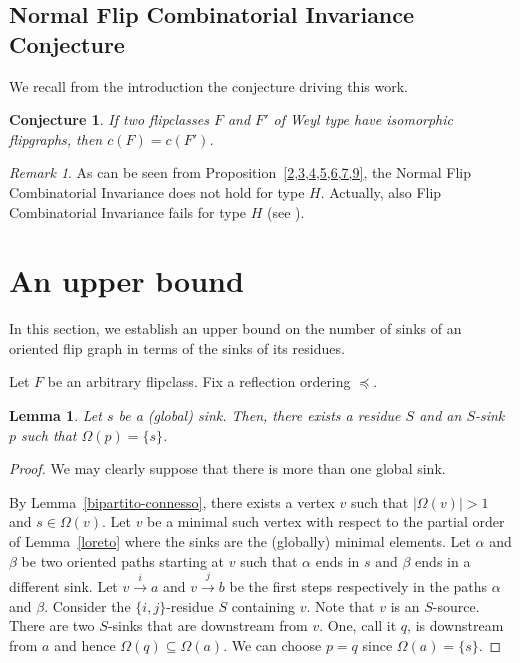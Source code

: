 \documentclass[12pt,reqno]{amsart}
\theoremstyle{plain}
\newtheorem{lem}[thm]{Lemma}
\newtheorem{con}[thm]{Conjecture}
\theoremstyle{definition}
\theoremstyle{remark}
\newtheorem{rmk}[thm]{Remark}
\begin{document}
\subsection{Normal Flip Combinatorial Invariance Conjecture}
We recall from the introduction the conjecture driving this work.
\begin{con}
If two flipclasses $F$ and $F'$ of Weyl type  have isomorphic flipgraphs, then $c(F)=c(F')$. 
\end{con}

\begin{rmk}
As can be seen from Proposition~\ref{2,3,4,5,6,7,9},  the Normal Flip Combinatorial Invariance does not hold  for type $H$. Actually, also Flip Combinatorial Invariance fails for type $H$  (see \cite [Remark~7.1]{EMS}).
\end{rmk}

\section{An upper bound}

In this section, we establish an upper bound on the number of sinks of an oriented flip graph in terms of the sinks of its residues.

Let $F$ be an arbitrary flipclass. Fix a reflection ordering $\preceq$. 
\begin{lem}\label{perlemmino1}
Let $s$ be a (global) sink. Then, there exists a residue $S$ and an $S$-sink $p$ such that $\Omega(p)= \{s\}$.
\end{lem}
\begin{proof}
We may clearly suppose that there is more than one global sink.

By Lemma~\ref{bipartito-connesso}, there exists a vertex $v$ such that $|\Omega(v)|>1$ and $s\in \Omega(v)$. Let $v$ be a minimal such vertex with respect to the partial order of Lemma~\ref{loreto} where the sinks are the (globally) minimal elements. %
Let $\alpha$ and $\beta$ be two oriented paths starting at $v$ such that $\alpha$ ends in $s$ and $\beta$ ends in a different sink. Let $v \stackrel{i}{\rightarrow} a$ and $v \stackrel{j}\rightarrow b$ be the first steps respectively in the paths $\alpha$ and $\beta$. Consider the $\{i,j\}$-residue $S$ containing $v$. Note that $v$ is an $S$-source. There are two $S$-sinks that are downstream from $v$. One, call it $q$,  is downstream from $a$ and hence $\Omega(q)\subseteq \Omega(a)$. We can choose $p=q$ since $ \Omega(a)=\{s\}$.
\end{proof}
\end{document}
